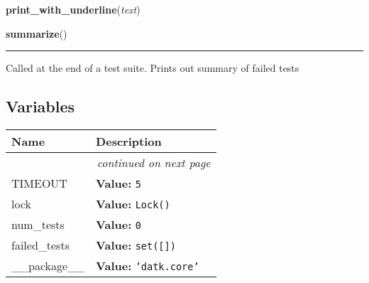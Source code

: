 \hspace{.8\funcindent}\begin{boxedminipage}{\funcwidth}

    \raggedright \textbf{print\_with\_underline}(\textit{text})

\setlength{\parskip}{2ex}
\setlength{\parskip}{1ex}
    \end{boxedminipage}

    \label{datk:core:tester:summarize}

    \vspace{0.5ex}

\hspace{.8\funcindent}\begin{boxedminipage}{\funcwidth}

    \raggedright \textbf{summarize}()

    \vspace{-1.5ex}

    \rule{\textwidth}{0.5\fboxrule}
\setlength{\parskip}{2ex}
    Called at the end of a test suite. Prints out summary of failed tests

\setlength{\parskip}{1ex}
    \end{boxedminipage}



  \subsection{Variables}

    \vspace{-1cm}
\hspace{\varindent}\begin{longtable}{|p{\varnamewidth}|p{\vardescrwidth}|l}
\cline{1-2}
\cline{1-2} \centering \textbf{Name} & \centering \textbf{Description}& \\
\cline{1-2}
\endhead\cline{1-2}\multicolumn{3}{r}{\small\textit{continued on next page}}\\\endfoot\cline{1-2}
\endlastfoot\raggedright T\-I\-M\-E\-O\-U\-T\- & \raggedright \textbf{Value:} 
{\tt 5}&\\
\cline{1-2}
\raggedright l\-o\-c\-k\- & \raggedright \textbf{Value:} 
{\tt Lock()}&\\
\cline{1-2}
\raggedright n\-u\-m\-\_\-t\-e\-s\-t\-s\- & \raggedright \textbf{Value:} 
{\tt 0}&\\
\cline{1-2}
\raggedright f\-a\-i\-l\-e\-d\-\_\-t\-e\-s\-t\-s\- & \raggedright \textbf{Value:} 
{\tt \texttt{set([}\texttt{])}}&\\
\cline{1-2}
\raggedright \_\-\_\-p\-a\-c\-k\-a\-g\-e\-\_\-\_\- & \raggedright \textbf{Value:} 
{\tt \texttt{'}\texttt{datk.core}\texttt{'}}&\\
\cline{1-2}
\end{longtable}

